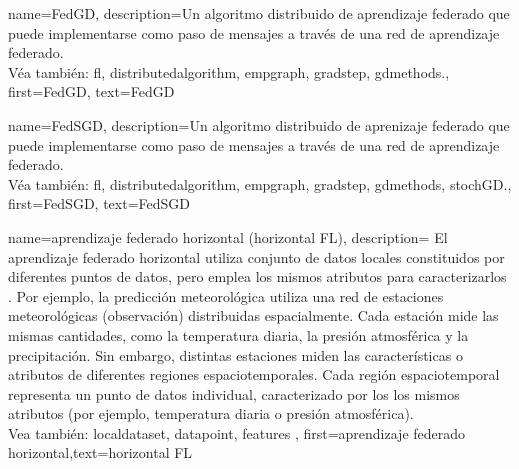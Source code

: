 
{name={FedGD},
	description={Un algoritmo distribuido de aprendizaje federado que 
		puede implementarse como paso de mensajes a través de una red de aprendizaje federado.\\ 
		Véa también: \gls{fl}, \gls{distributedalgorithm}, \gls{empgraph}, \gls{gradstep}, \gls{gdmethods}.},
	first={FedGD},
	text={FedGD}
} 

{name={FedSGD},
	description={Un algoritmo distribuido de aprenizaje federado que 
		puede implementarse como paso de mensajes a través de una red de aprendizaje federado.\\ 
		Véa también: \gls{fl}, \gls{distributedalgorithm}, \gls{empgraph}, \gls{gradstep}, \gls{gdmethods}, \gls{stochGD}.},
	first={FedSGD},
	text={FedSGD}
} 


{name={aprendizaje federado horizontal (horizontal FL)},
	description={
		El aprendizaje federado horizontal utiliza conjunto de datos locales constituidos por diferentes
		puntos de datos, pero emplea los mismos atributos para caracterizarlos \cite{HFLChapter2020}.
		Por ejemplo, la predicción meteorológica utiliza una red de estaciones meteorológicas
		(observación) distribuidas espacialmente. Cada estación mide las mismas cantidades, como
		la temperatura diaria, la presión atmosférica y la precipitación. Sin embargo,
		distintas estaciones miden las características o atributos de diferentes regiones espaciotemporales.
		Cada región espaciotemporal representa un punto de datos individual, caracterizado por los los mismos atributos
		(por ejemplo, temperatura diaria o presión atmosférica).
		\\
			Vea también: \gls{localdataset}, \gls{datapoint}, \gls{feature}s },
	first={aprendizaje federado horizontal},text={horizontal FL}
}

